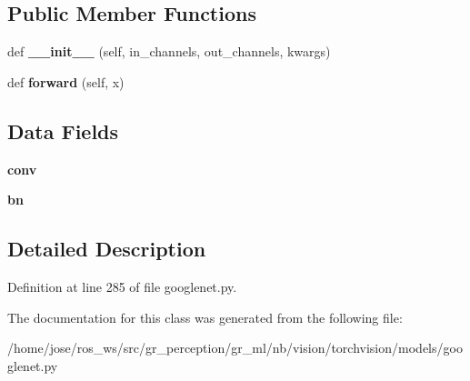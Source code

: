 \subsection*{Public Member Functions}
\begin{DoxyCompactItemize}
\item 
\mbox{\label{classtorchvision_1_1models_1_1googlenet_1_1BasicConv2d_a4d9cb24f069b26e5f4f362d0ff522da1}} 
def {\bfseries \+\_\+\+\_\+init\+\_\+\+\_\+} (self, in\+\_\+channels, out\+\_\+channels, kwargs)
\item 
\mbox{\label{classtorchvision_1_1models_1_1googlenet_1_1BasicConv2d_a69d77068dd4eca8935743602e2f2f376}} 
def {\bfseries forward} (self, x)
\end{DoxyCompactItemize}
\subsection*{Data Fields}
\begin{DoxyCompactItemize}
\item 
\mbox{\label{classtorchvision_1_1models_1_1googlenet_1_1BasicConv2d_ac267b5767772bbd9b02dc90053539d2d}} 
{\bfseries conv}
\item 
\mbox{\label{classtorchvision_1_1models_1_1googlenet_1_1BasicConv2d_a1c054c6202458ef91c51085af7dfc985}} 
{\bfseries bn}
\end{DoxyCompactItemize}


\subsection{Detailed Description}


Definition at line 285 of file googlenet.\+py.



The documentation for this class was generated from the following file\+:\begin{DoxyCompactItemize}
\item 
/home/jose/ros\+\_\+ws/src/gr\+\_\+perception/gr\+\_\+ml/nb/vision/torchvision/models/googlenet.\+py\end{DoxyCompactItemize}
